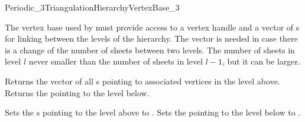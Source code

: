 
\begin{ccRefConcept}{Periodic_3TriangulationHierarchyVertexBase_3}

\ccDefinition

The vertex base used by 
must provide access to a vertex handle and a vector of
s for linking between the levels of the
hierarchy. The vector is needed in case there is a change of the
number of sheets between two levels. The number of sheets in level $l$
never smaller than the number of sheets in level $l-1$, but it can be
larger.



\ccAccessFunctions
{}
\ccTagFullDeclarations

{Returns the vector of all s pointing to associated
  vertices in the level above.}
\ccGlue
{}
{Returns the  pointing to the level below.}


{Sets the s pointing to the level above to .}
\ccGlue
{}
{Sets the  pointing to the level below to .}

\ccHasModels



\end{ccRefConcept}
